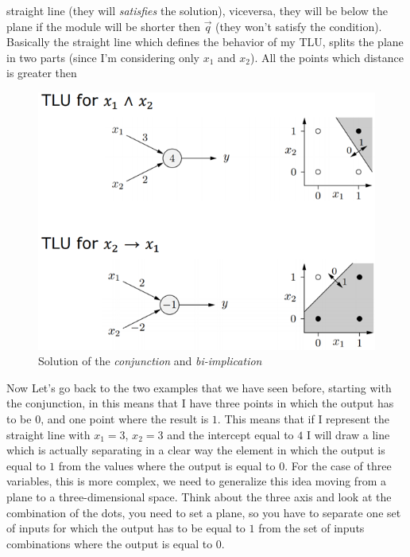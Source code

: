 \documentclass{article}
\begin{document}
straight line (they will \textit{satisfies} the solution), viceversa, they will be below the plane if the
module will be shorter then $\vec{q}$ (they won't satisfy the condition).
\newline\newline
Basically the straight line which defines the behavior of my TLU, splits the plane in two parts (since I'm
considering only $x_1$ and $x_2$). All the points which distance is greater then
\begin{figure}[H]
    \centering
    \includegraphics[scale=0.8]{images/tlu_examples_interp.png}
    \caption{Solution of the \textit{conjunction} and \textit{bi-implication}}
    \label{fig:example_interp}
\end{figure}
Now Let’s go back to the two examples that we have seen before,
starting with the conjunction, in this means that I have three points in which the output
has to be $0$, and one point where the result is $1$. This means that if I represent the straight
line with $x_1=3$, $x_2=3$ and the intercept equal to $4$ I will draw a line which is actually
separating in a clear way the element in which the output is equal to $1$ from the values
where the output is equal to $0$.
\newline\newline
For the case of three variables, this is more complex, we need to generalize this idea moving from
a plane to a three-dimensional space. Think about the three axis and look at the combination of the
dots, you need to set a plane, so you have to separate one set of inputs for which the output has
to be equal to $1$ from the set of inputs combinations where the output is equal to $0$.
\end{document}
